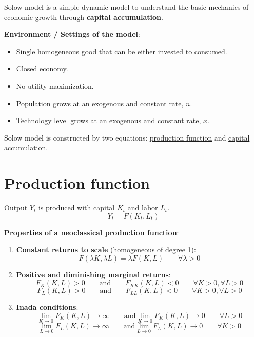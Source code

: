 

Solow model is a simple dynamic model to understand the basic mechanics of economic growth through \textbf{capital accumulation}.

\textbf{Environment / Settings of the model}: \begin{itemize}
    \item Single homogeneous good that can be either invested to consumed.
    \item Closed economy.
    \item No utility maximization.
    \item Population grows at an exogenous and constant rate, $n$.
    \item Technology level grows at an exogenous and constant rate, $x$.
\end{itemize}

Solow model is constructed by two equations: \underline{production function} and \underline{capital accumulation}.

\section{Production function} Output $Y_t$ is produced with capital $K_t$ and labor $L_t$.
\[
    Y_t = F(K_t, L_t)
\]

\textbf{Properties of a neoclassical production function}: \begin{enumerate}
    \item \textbf{Constant returns to scale} (homogeneous of degree 1): \[
              F(\lambda K, \lambda L) = \lambda F(K,L) \qquad \forall \lambda > 0
          \]
    \item \textbf{Positive and diminishing marginal returns}: \[
              F_K(K,L) > 0 \qquad \text{and} \qquad F_{KK}(K,L) < 0 \qquad \forall K > 0, \forall L > 0
          \] \[
              F_L(K,L) > 0 \qquad \text{and} \qquad F_{LL}(K,L) < 0 \qquad \forall K > 0, \forall L > 0
          \]
    \item \textbf{Inada conditions}: \[
              \lim_{K \to 0} F_K(K,L) \to \infty \qquad \text{and} \lim_{K \to 0} F_K(K,L) \to 0 \qquad \forall L > 0
          \] \[
              \lim_{L \to 0} F_L(K,L) \to \infty \qquad \text{and} \lim_{L \to 0} F_L(K,L) \to 0 \qquad \forall K > 0
          \]
\end{enumerate}




